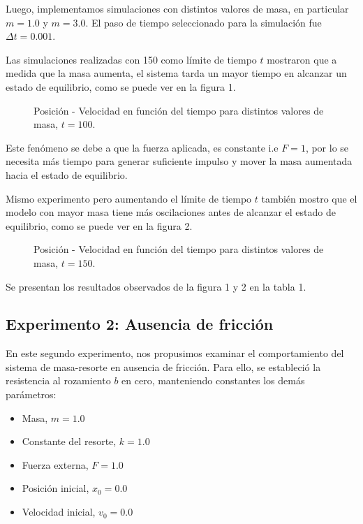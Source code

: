 \documentclass{article}
\begin{document}
Luego, implementamos simulaciones con distintos valores de masa, en particular $m = 1.0$ y $m = 3.0$. El paso de tiempo seleccionado para la simulación fue $\Delta t= 0.001$.

Las simulaciones realizadas con 150 como límite de tiempo $t$ mostraron que a medida que la masa aumenta, el sistema tarda un mayor tiempo en alcanzar un estado de equilibrio, como se puede ver en la figura 1.

\begin{figure}[H]
\centering
\caption{Posición - Velocidad en función del tiempo para distintos valores de masa, $t = 100$.}
\end{figure}

Este fenómeno se debe a que la fuerza aplicada, es constante i.e $F = 1$, por lo se necesita más tiempo para generar suficiente impulso y mover la masa aumentada hacia el estado de equilibrio.

Mismo experimento pero aumentando el límite de tiempo 
$t$ también mostro que el modelo con mayor masa tiene más oscilaciones antes de alcanzar el estado de equilibrio, como se puede ver en la figura 2.

\begin{figure}[H]
    \centering
    \caption{Posición - Velocidad en función del tiempo para distintos valores de masa, $t = 150$.}
\end{figure}
    

Se presentan los resultados observados de la figura 1 y 2 en la tabla 1.


\subsection{Experimento 2: Ausencia de fricción}
En este segundo experimento, nos propusimos examinar el comportamiento del sistema de masa-resorte en ausencia de fricción. Para ello, se estableció la resistencia al rozamiento $b$ en cero, manteniendo constantes los demás parámetros:

\begin{itemize}
\item Masa, $m = 1.0$
\item Constante del resorte, $k = 1.0$
\item Fuerza externa, $F = 1.0$
\item Posición inicial, $x_0 = 0.0$
\item Velocidad inicial, $v_0 = 0.0$
\end{itemize}
\end{document}
